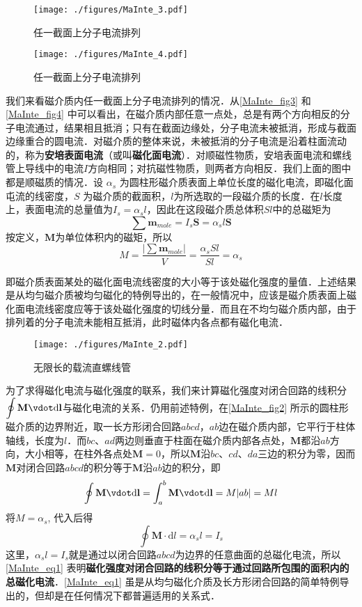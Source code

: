 \begin{figure}[ht]
\centering
\texttt{[image: ./figures/MaInte\_3.pdf]}
\caption{任一截面上分子电流排列} \label{MaInte_fig3}
\end{figure}
\begin{figure}[ht]
\centering
\texttt{[image: ./figures/MaInte\_4.pdf]}
\caption{任一截面上分子电流排列} \label{MaInte_fig4}
\end{figure}
我们来看磁介质内任一截面上分子电流排列的情况．从\autoref{MaInte_fig3} 和\autoref{MaInte_fig4} 中可以看出，在磁介质内部任意一点处，总是有两个方向相反的分子电流通过，结果相且抵消；只有在截面边缘处，分子电流未被抵消，形成与截面边缘重合的圆电流．对磁介质的整体来说，未被抵消的分子电流是沿着柱面流动的，称为\textbf{安培表面电流}（或叫\textbf{磁化面电流}）．对顺磁性物质，安培表面电流和螺线管上导线中的电流$I$方向相同；对抗磁性物质，则两者方向相反．我们上面的图中都是顺磁质的情况．设 $\alpha_s$ 为圆柱形磁介质表面上单位长度的磁化电流，即磁化面屯流的线密度，$S$ 为磁介质的截面积，$ l $为所选取的一段磁介质的长度．在$l $长度上，表面电流的总量值为$I_s=\alpha_sl$，因此在这段磁介质总体积$Sl$中的总磁矩为
\begin{equation}
\sum \mathbf{m}_{mole}=I_{s} \mathbf S=\alpha_{s} l \mathbf S
\end{equation}
按定义，$\mathbf  M $为单位体积内的磁矩，所以
\begin{equation}
M=\frac{\left|\sum \mathbf  m_{mole}\right|}{V}=\frac{\alpha_{s} S l}{S l}=\alpha_s
\end{equation}

即磁介质表面某处的磁化面电流线密度的大小等于该处磁化强度的量值．上述结果是从均匀磁介质被均匀磁化的特例导出的，在一般情况中，应该是磁介质表面上磁化面电流线密度应等于该处磁化强度的切线分量．而且在不均匀磁介质内部，由于排列着的分子电流未能相互抵消，此时磁体内各点都有磁化电流．

\begin{figure}[ht]
\centering
\texttt{[image: ./figures/MaInte\_2.pdf]}
\caption{无限长的载流直螺线管} \label{MaInte_fig2}
\end{figure}
为了求得磁化电流与磁化强度的联系，我们来计算磁化强度对闭合回路的线积分$\displaystyle \oint \mathbf M \vdot \mathrm{d} \mathbf l$与磁化电流的关系．仍用前述特例，在\autoref{MaInte_fig2} 所示的圆柱形磁介质的边界附近，取一长方形闭合回路$abcd$，$ab $边在磁介质内部，它平行于柱体轴线，长度为$l$．而$bc$、$ad $两边则垂直于柱面在磁介质内部各点处，$\mathbf M$都沿$ab $方向，大小相等，在柱外各点处$\mathbf M=0$，所以$\mathbf M $沿$bc$、$cd$、$da $三边的积分为零，因而$\mathbf M $对闭合回路$abcd$的积分等于$\mathbf M $沿$ab $边的积分，即
\begin{equation}
\oint \mathbf{M}\vdot  \mathrm{d} \mathbf{l}=\int_{a}^{b} \mathbf{M} \vdot  \mathrm{d} \mathbf{l}=M|a b|=M l
\end{equation}
将$M=\alpha_s$, 代入后得
\begin{equation} \label{MaInte_eq1}
\oint \mathbf M \cdot \mathrm{d} l=\alpha_{s} l=I_{s}
\end{equation}
这里，$\alpha_sl=I_s$就是通过以闭合回路$abcd$为边界的任意曲面的总磁化电流，所以\autoref{MaInte_eq1} 表明\textbf{磁化强度对闭合回路的线积分等于通过回路所包围的面积内的总磁化电流}．\autoref{MaInte_eq1} 虽是从均匀磁化介质及长方形闭合回路的简单特例导出的，但却是在任何情况下都普遍适用的关系式．
